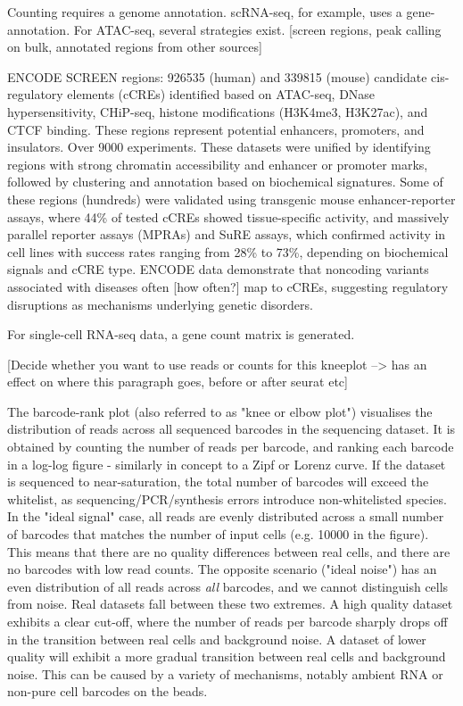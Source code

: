 Counting requires a genome annotation. scRNA-seq, for example, uses a gene-annotation. For ATAC-seq, several strategies exist. [screen regions, peak calling on bulk, annotated regions from other sources]

ENCODE SCREEN regions: \num{926535} (human) and \num{339815} (mouse) candidate cis-regulatory elements (cCREs) identified based on ATAC-seq, DNase hypersensitivity, CHiP-seq, histone modifications (H3K4me3, H3K27ac), and CTCF binding. These regions represent potential enhancers, promoters, and insulators. Over 9000 experiments. These datasets were unified by identifying regions with strong chromatin accessibility and enhancer or promoter marks, followed by clustering and annotation based on biochemical signatures. Some of these regions (hundreds) were validated using transgenic mouse enhancer-reporter assays, where 44\% of tested cCREs showed tissue-specific activity, and massively parallel reporter assays (MPRAs) and SuRE assays, which confirmed activity in cell lines with success rates ranging from 28\% to 73\%, depending on biochemical signals and cCRE type. ENCODE data demonstrate that noncoding variants associated with diseases often [how often?] map to cCREs, suggesting regulatory disruptions as mechanisms underlying genetic disorders.

For single-cell RNA-seq data, a gene count matrix is generated.

	[Decide whether you want to use reads or counts for this kneeplot --> has an effect on where this paragraph goes, before or after seurat etc]

The barcode-rank plot (also referred to as "knee or elbow plot") visualises the distribution of reads across all sequenced barcodes in the sequencing dataset. It is obtained by counting the number of reads per barcode, and ranking each barcode in a log-log figure - similarly in concept to a Zipf or Lorenz curve. If the dataset is sequenced to near-saturation, the total number of barcodes will exceed the whitelist, as sequencing/PCR/synthesis errors introduce non-whitelisted species. In the "ideal signal" case, all reads are evenly distributed across a small number of barcodes that matches the number of input cells (e.g. \num{10000} in the figure). This means that there are no quality differences between real cells, and there are no barcodes with low read counts. The opposite scenario ("ideal noise") has an even distribution of all reads across \textit{all} barcodes, and we cannot distinguish cells from noise. Real datasets fall between these two extremes. A high quality dataset exhibits a clear cut-off, where the number of reads per barcode sharply drops off in the transition between real cells and background noise. A dataset of lower quality will exhibit a more gradual transition between real cells and background noise. This can be caused by a variety of mechanisms, notably ambient RNA or non-pure cell barcodes on the beads.

